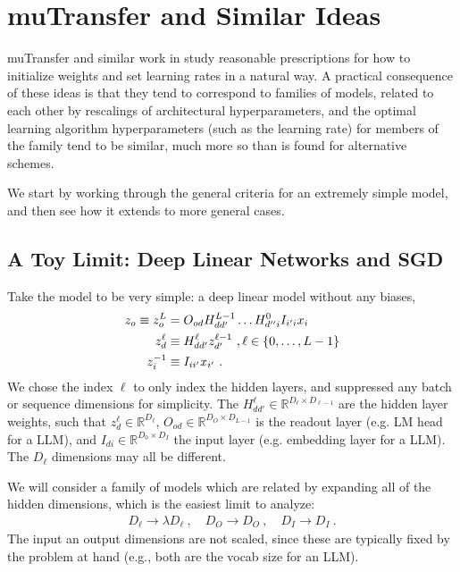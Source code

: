 \section{muTransfer and Similar Ideas}


muTransfer \cite{yang2022tensor} and similar work in \cite{physicalDL,
yaida2022metaprincipledfamilyhyperparameterscaling,doshi2023criticalinitializationwidedeep} study
reasonable prescriptions for how to initialize weights and set learning rates in a natural way. A
practical consequence of these ideas is that they tend to correspond to families of models, related
to each other by rescalings of architectural hyperparameters, and the optimal learning algorithm
hyperparameters (such as the learning rate) for members of the family tend to be similar, much more
so than is found for alternative schemes.

We start by working through the general criteria for an extremely simple model, and then see how it
extends to more general cases.


\subsection{A Toy Limit: Deep Linear Networks and SGD}

Take the model to be very simple: a deep linear model without any biases,
\begin{align}
    z _{ o } \equiv  z ^{ L }_{ o } &= O _{ od } H ^{ L-1 }_{ d d' } \ldots H ^{ 0 } _{ d'' i }I _{ i 'i } x _{ i } \nonumber\\
    z ^{ \ell }_{ d } & \equiv H ^{ \ell }_{ d d' } z ^{ \ell-1 }_{ d' }  \ , \ell \in \left \{ 0, \ldots , L-1 \right \}\nonumber\\
    z ^{-1}_{ i } & \equiv I _{ i i' } x _{ i' }  \ . \label{app_eq_deep_linear_model}
\end{align}
We chose the index $ \ell $ to only index the hidden layers, and suppressed any batch or sequence
dimensions for simplicity. The $ H ^{ \ell } _{ d d' } \in \mathbb{R} ^{ D _{ \ell  } \times D  _{
\ell-1 } } $  are the hidden layer weights, such that $ z_{ d }^{ \ell }\in \mathbb{R}^{ D_{
\ell } } $,  $O _{ o d } \in \mathbb{R} ^{ D _{O}\times D  _{ L-1 } } $ is the readout layer
(e.g. LM head for a LLM), and $I  _{ d i } \in \mathbb{R} ^{ D _{ 0} \times D  _{I} } $ the
input layer (e.g. embedding layer for a LLM). The $ D_{ \ell } $ dimensions may all be different.


We will consider a family of models which are related by expanding all of the hidden dimensions, which is
the easiest limit to analyze:
\begin{align}
    D _{\ell } \longrightarrow   \lambda D _{ \ell }\ ,\quad D _{O } \longrightarrow   D _{O}\ ,\quad
    D _{I} \longrightarrow   D _{I}\ . \label{app_eq_mup_width_scaling}
\end{align}
The input an output dimensions are not scaled, since these are typically fixed by the problem at
hand (e.g., both are the vocab size for an LLM).

